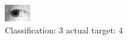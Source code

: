 \begin{figure}[h!]
\begin{center}
\includegraphics[width=0.60\columnwidth]{figures/ID1208_class_3_target_4.png}
\end{center}
\caption{ Classification: 3 actual target: 4}
\label{fig:ID1208_class_3_target_4}
\end{figure}
